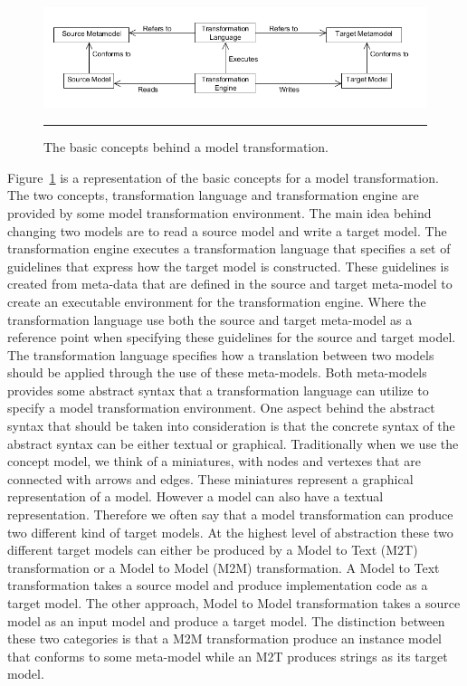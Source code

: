 \begin{figure}[H]
  \centering
    \includegraphics[scale=0.5]{./Figures/BasicTransformation.png}
    \rule{35em}{0.5pt}
  \caption[Basic Model Transformation]
  {The basic concepts behind a model transformation.}
  \label{fig:BasicTransformation}
\end{figure}

Figure~\ref{fig:BasicTransformation} is a representation of the basic concepts
for a model transformation. The two concepts, transformation language and
transformation engine are provided by some model transformation environment.
The main idea behind changing two models are to read a source model and write a
target model. The transformation engine executes a transformation language that
specifies a set of guidelines that express how the target model is constructed.
These guidelines is created from meta-data that are defined in the source and
target meta-model to create an executable environment for the transformation
engine. Where the transformation language use both the source and target
meta-model as a reference point when specifying these guidelines for the source
and target model. The transformation language specifies how a translation
between two models should be applied through the use of these meta-models. Both
meta-models provides some abstract syntax that a transformation language can
utilize to specify a model transformation environment. One aspect behind the
abstract syntax that should be taken into consideration is that the concrete
syntax of the abstract syntax can be either textual or graphical. Traditionally
when we use the concept model, we think of a miniatures, with nodes and
vertexes that are connected with arrows and edges. These miniatures represent a
graphical representation of a model. However a model can also have a textual
representation. Therefore we often say that a model transformation can produce
two different kind of target models. At the highest level of abstraction these
two different target models can either be produced by a Model to Text (M2T)
transformation or a Model to Model (M2M) transformation. A Model to Text
transformation takes a source model and produce implementation code as a target
model. The other approach, Model to Model transformation takes a source model as
an input model and produce a target model. The distinction between these two
categories is that a M2M transformation produce an instance model that conforms
to some meta-model while an M2T produces strings as its target model.

